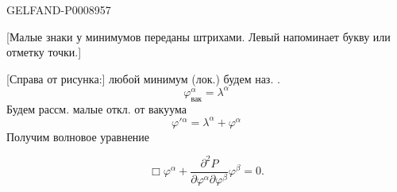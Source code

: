 \begin{GelfandAdjacentEvidence}{GELFAND-P000895}{7}

[Малые знаки у минимумов переданы штрихами. Левый напоминает букву или отметку точки.]

[Справа от рисунка:] любой минимум (лок.) будем наз. .
\begin{equation*}
\varphi^\alpha_{\text{вак}}=\lambda^\alpha \tag{14}
\end{equation*}
Будем рассм. малые откл. от вакуума
\begin{equation*}
\varphi'{}^\alpha=\lambda^\alpha+\varphi^\alpha \tag{15}
\end{equation*}
Получим волновое уравнение
\end{GelfandAdjacentEvidence}

\begin{equation*}
\Box\varphi^\alpha+\frac{\partial^2 P}{\partial\varphi^\alpha\partial\varphi^\beta}\varphi^\beta=0.
\tag{16}
\end{equation*}



